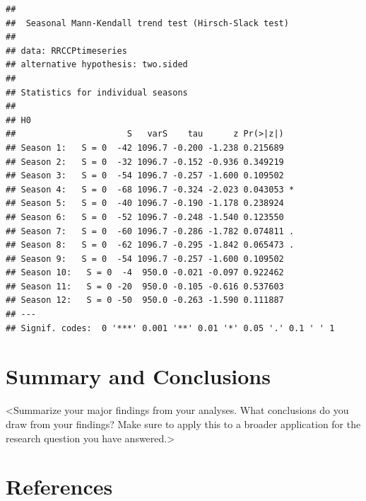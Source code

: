 \documentclass[12pt,]{article}
\begin{document}
\begin{verbatim}
## 
##  Seasonal Mann-Kendall trend test (Hirsch-Slack test)
## 
## data: RRCCPtimeseries
## alternative hypothesis: two.sided
## 
## Statistics for individual seasons
## 
## H0
##                      S   varS    tau      z Pr(>|z|)  
## Season 1:   S = 0  -42 1096.7 -0.200 -1.238 0.215689  
## Season 2:   S = 0  -32 1096.7 -0.152 -0.936 0.349219  
## Season 3:   S = 0  -54 1096.7 -0.257 -1.600 0.109502  
## Season 4:   S = 0  -68 1096.7 -0.324 -2.023 0.043053 *
## Season 5:   S = 0  -40 1096.7 -0.190 -1.178 0.238924  
## Season 6:   S = 0  -52 1096.7 -0.248 -1.540 0.123550  
## Season 7:   S = 0  -60 1096.7 -0.286 -1.782 0.074811 .
## Season 8:   S = 0  -62 1096.7 -0.295 -1.842 0.065473 .
## Season 9:   S = 0  -54 1096.7 -0.257 -1.600 0.109502  
## Season 10:   S = 0  -4  950.0 -0.021 -0.097 0.922462  
## Season 11:   S = 0 -20  950.0 -0.105 -0.616 0.537603  
## Season 12:   S = 0 -50  950.0 -0.263 -1.590 0.111887  
## ---
## Signif. codes:  0 '***' 0.001 '**' 0.01 '*' 0.05 '.' 0.1 ' ' 1
\end{verbatim}

\newpage

\hypertarget{summary-and-conclusions}{%
\section{Summary and Conclusions}\label{summary-and-conclusions}}

\textless Summarize your major findings from your analyses. What
conclusions do you draw from your findings? Make sure to apply this to a
broader application for the research question you have
answered.\textgreater{}

\hypertarget{references}{%
\section{References}\label{references}}
\end{document}
